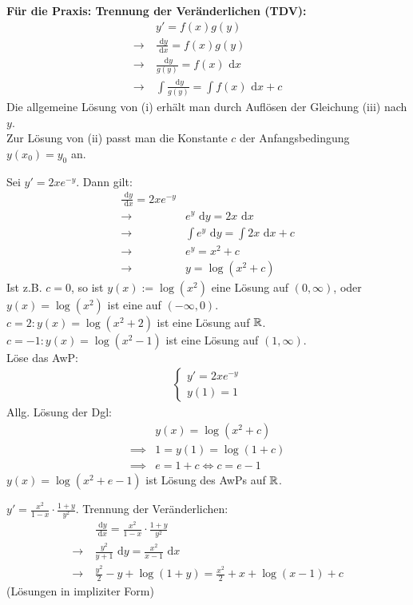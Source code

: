 \documentclass[a4paper,twoside,DIV15,BCOR12mm,chapterprefix=true,headings=twolinechapter]{scrbook}
\begin{document}
\textbf{Für die Praxis: Trennung der Veränderlichen (TDV):}\\
\begin{align*}
&y'=f(x)g(y)\\
\to\ &\frac{\text{ d}y}{\text{ d}x}=f(x)g(y)\\
\to\ &\frac{\text{ d}y}{g(y)}=f(x)\text{ d}x\\
\to\ &\int{\frac{\text{ d}y}{g(y)}}=\int f(x)\text{ d}x+c\tag{iii}
\end{align*}
Die allgemeine Lösung von (i) erhält man durch Auflösen der Gleichung (iii) nach $y$.\\
Zur Lösung von (ii) passt man die Konstante $c$ der Anfangsbedingung $y(x_0)=y_0$ an.

\begin{beispiele}
\item Sei $y'=2xe^{-y}$. Dann gilt:
\begin{align*}
\frac{\text{ d}y}{\text{ d}x}=2xe^{-y}\\
\to\ &e^y\text{ d}y = 2x\text{ d}x\\
\to\ &\int e^y\text{ d}y=\int 2x\text{ d}x+c\\
\to\ & e^y=x^2+c\\
\to\ &y=\log(x^2+c)
\end{align*}
Ist z.B. $c=0$, so ist $y(x):=\log(x^2)$ eine Lösung auf $(0,\infty)$, oder
$y(x)=\log(x^2)$ ist eine auf $(-\infty,0)$.\\
$c=2: y(x)=\log(x^2+2)$ ist eine Lösung auf $\mathbb{R}$.\\
$c=-1: y(x)=\log(x^2-1)$ ist eine Lösung auf $(1,\infty)$.\\
Löse das AwP:
\begin{align*}
\begin{cases}
y'=2xe^{-y}\\
y(1)=1
\end{cases}
\end{align*}
Allg. Lösung der Dgl:
\begin{align*}
&y(x)=\log(x^2+c)\\
\implies &1=y(1)=\log(1+c)\\
\implies &e=1+c \iff c=e-1
\end{align*}
$y(x)=\log(x^2+e-1)$ ist Lösung des AwPs auf $\mathbb{R}$.
\item $y'=\frac{x^2}{1-x}\cdot\frac{1+y}{y^2}$. Trennung der Veränderlichen:
\begin{align*}
&\frac{\text{ d}y}{\text{ d}x}=\frac{x^2}{1-x}\cdot\frac{1+y}{y^2}\\
\to\ &\frac{y^2}{y+1}\text{ d}y=\frac{x^2}{x-1}\text{ d}x\\
\to\ &\frac{y^2}2-y+\log(1+y)=\frac{x^2}2+x+\log(x-1)+c
\end{align*}
(Lösungen in impliziter Form)
\end{beispiele}
\end{document}
